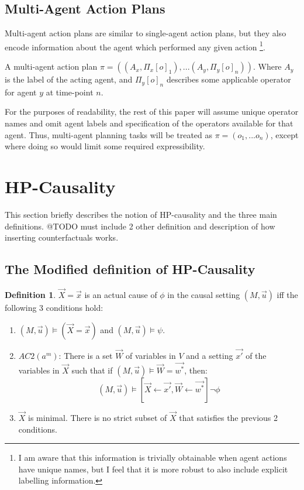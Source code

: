 \documentclass{article}
\theoremstyle{plain}
\theoremstyle{definition}
\newtheorem{defn}[thm]{Definition} %
\begin{document}
\subsection{Multi-Agent Action Plans}
Multi-agent action plans are similar to single-agent action plans, but they also encode information about the agent which performed any given action \footnote{I am aware that this information is trivially obtainable when agent actions have unique names, but I feel that it is more robust to also include explicit labelling information.}.

A multi-agent action plan $\pi=((A_x, \Pi_x[o]_1),...(A_y, \Pi_y[o]_n))$. Where $A_y$ is the label of the acting agent, and $\Pi_y[o]_n$ describes some applicable operator for agent $y$ at time-point $n$.

For the purposes of readability, the rest of this paper will assume unique operator names and omit agent labels and specification of the operators available for that agent. Thus, multi-agent planning tasks will be treated as $\pi=(o_1,...o_n)$, except where doing so would limit some required expressibility. 




\section{HP-Causality}
This section briefly describes the notion of HP-causality and the three main definitions. @TODO must include 2 other definition and description of how inserting counterfactuals works.

\subsection{The Modified definition of HP-Causality}
\begin{defn}$\vec{X}=\vec{x}$ is an actual cause of $\phi$ in the causal setting $(M,\vec{u})$ iff the following 3 conditions hold:
\begin{enumerate}
\item $(M,\vec{u}) \models (\vec{X}=\vec{x})$ and $(M,\vec{u}) \models \psi$.
\item $AC2(a^m)$: There is a set $\vec{W}$ of variables in $V$ and a setting $\vec{x'}$ of the variables in $\vec{X}$ such that if $(M,\vec{u}) \models \vec{W} = \vec{w^*}$, then:
\[
(M,\vec{u}) \models [\vec{X} \leftarrow \vec{x'}, \vec{W} \leftarrow \vec{w^*}] \neg \phi
\]
\item $\vec{X}$ is minimal. There is no strict subset of $\vec{X}$ that satisfies the previous 2 conditions.
\end{enumerate}

\end{defn}
\end{document}
